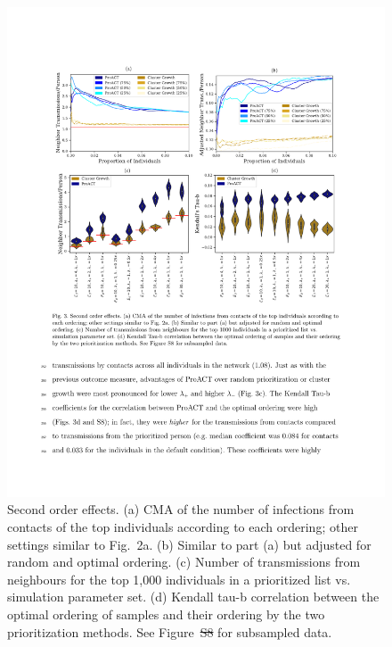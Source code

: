 \documentclass[a4paper,11pt]{article}
\newcommand{\PLWH}{sample\xspace}
\providecommand{\DIFadd}[1]{{\protect\color{blue}\uwave{#1}}} %
\providecommand{\DIFdel}[1]{{\protect\color{red}\sout{#1}}}                      %
\providecommand{\DIFdelbegin}{} %
\providecommand{\DIFaddFL}[1]{\DIFadd{#1}} %
\providecommand{\DIFdelFL}[1]{\DIFdel{#1}} %
\providecommand{\DIFaddbeginFL}{} %
\providecommand{\DIFaddendFL}{} %
\providecommand{\DIFdelbeginFL}{} %
\providecommand{\DIFdelendFL}{} %
\begin{document}
\DIFdelbegin %
\DIFdelendFL \DIFaddbeginFL \begin{figure}[!t]
\DIFaddendFL \centering
\includegraphics[width=\textwidth]{figs/Fig3.pdf}
\caption{Second order effects. 
(a) CMA of the number of infections from contacts of the top individuals according to each ordering; other settings similar to Fig.~2a. (b)
Similar to  part (a) but adjusted for random and optimal ordering.
(c)
Number of transmissions from neighbours for the top 1,000 individuals  in a prioritized list vs. simulation parameter set.
 (d) 
 Kendall tau-b correlation between the optimal ordering of \PLWH{s}  and their ordering by the two prioritization methods.
 See Figure~\DIFdelbeginFL \DIFdelFL{S8 }\DIFdelendFL \DIFaddbeginFL \DIFaddFL{S10 }\DIFaddendFL for subsampled data. 
 }
\label{fig:efficacy-neighbors}
\end{figure}
\end{document}
